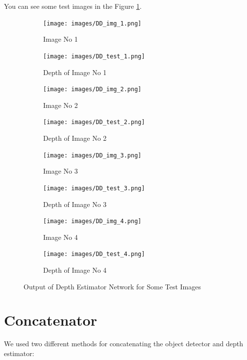\documentclass[a4paper, openany]{book}
\begin{document}
You can see some test images in the Figure \ref{fig:DD_t_images}.

\begin{figure}[ht]
  \centering
  \begin{subfigure}[b]{0.3\linewidth}
    \texttt{[image: images/DD\_img\_1.png]}
    \caption{Image No 1}
  \end{subfigure}
  \begin{subfigure}[b]{0.3\linewidth}
    \texttt{[image: images/DD\_test\_1.png]}
    \caption{Depth of Image No 1}
  \end{subfigure}
  
    \begin{subfigure}[b]{0.3\linewidth}
    \texttt{[image: images/DD\_img\_2.png]}
    \caption{Image No 2}
  \end{subfigure}
  \begin{subfigure}[b]{0.3\linewidth}
    \texttt{[image: images/DD\_test\_2.png]}
    \caption{Depth of  Image No 2}
  \end{subfigure}
  
  \begin{subfigure}[b]{0.3\linewidth}
    \texttt{[image: images/DD\_img\_3.png]}
    \caption{Image No 3}
  \end{subfigure}
    \begin{subfigure}[b]{0.3\linewidth}
    \texttt{[image: images/DD\_test\_3.png]}
    \caption{Depth of Image No 3}
  \end{subfigure}
  
  \begin{subfigure}[b]{0.3\linewidth}
    \texttt{[image: images/DD\_img\_4.png]}
    \caption{Image No 4}
  \end{subfigure}
  \begin{subfigure}[b]{0.3\linewidth}
    \texttt{[image: images/DD\_test\_4.png]}
    \caption{Depth of Image No 4}
  \end{subfigure}
  
  \caption{Output of Depth Estimator Network for Some Test Images}
  \label{fig:DD_t_images}
\end{figure}

\newpage
	
\section{Concatenator}
	\vspace{0.3cm}

We used two different methods for concatenating the object detector and depth estimator:
\end{document}
